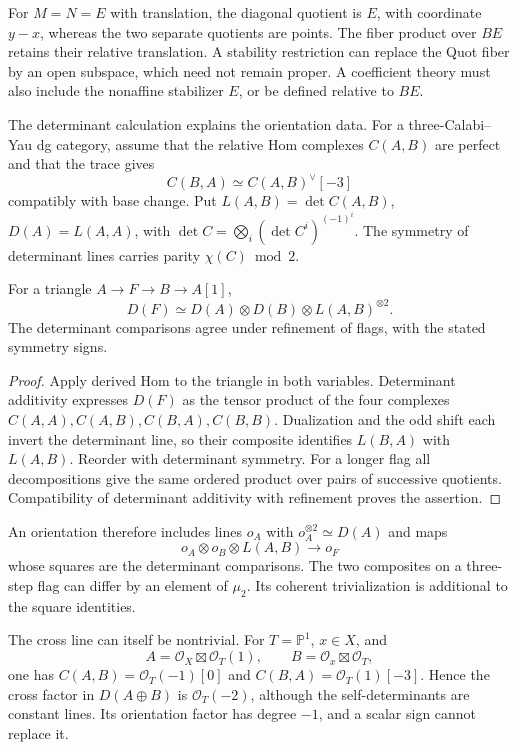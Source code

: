 For \(M=N=E\) with translation, the diagonal quotient is
\(E\), with coordinate \(y-x\), whereas the two separate
quotients are points. The fiber product over \(BE\)
retains their relative translation.
A stability restriction can replace the Quot fiber by an
open subspace, which need not remain proper.
A coefficient theory must also include the nonaffine
stabilizer \(E\), or be defined relative to \(BE\).

The determinant calculation explains the orientation data.
For a three-Calabi--Yau dg category, assume that the relative
Hom complexes \(C(A,B)\) are perfect and that the trace gives
\[
 C(B,A)\simeq C(A,B)^\vee[-3]
\]
compatibly with base change.
Put \(L(A,B)=\det C(A,B)\), \(D(A)=L(A,A)\), with
\(\det C=\bigotimes_i(\det C^i)^{(-1)^i}\).
The symmetry of determinant lines carries parity
\(\chi(C)\bmod2\).

\begin{proposition}\label{mht:prop:compact-extension-line}
For a triangle \(A\to F\to B\to A[1]\),
\[
 D(F)\simeq D(A)\otimes D(B)\otimes L(A,B)^{\otimes2}.
\]
The determinant comparisons agree under refinement of flags,
with the stated symmetry signs.
\end{proposition}
\begin{proof}
Apply derived Hom to the triangle in both variables.
Determinant additivity expresses \(D(F)\) as the tensor
product of the four complexes \(C(A,A),C(A,B),C(B,A),C(B,B)\).
Dualization and the odd shift each invert the determinant
line, so their composite identifies \(L(B,A)\) with
\(L(A,B)\). Reorder with determinant symmetry.
For a longer flag all decompositions give the same ordered
product over pairs of successive quotients.
Compatibility of determinant additivity with refinement
proves the assertion.
\end{proof}

An orientation therefore includes lines \(o_A\) with
\(o_A^{\otimes2}\simeq D(A)\) and maps
\[
 o_A\otimes o_B\otimes L(A,B)\longrightarrow o_F
\]
whose squares are the determinant comparisons.
The two composites on a three-step flag can differ by
an element of \(\mu_2\). Its coherent trivialization is
additional to the square identities.

The cross line can itself be nontrivial.
For \(T=\mathbb P^1\), \(x\in X\), and
\[
 A=\mathcal O_X\boxtimes\mathcal O_T(1),\qquad
 B=\mathcal O_x\boxtimes\mathcal O_T,
\]
one has \(C(A,B)=\mathcal O_T(-1)[0]\) and
\(C(B,A)=\mathcal O_T(1)[-3]\).
Hence the cross factor in \(D(A\oplus B)\) is
\(\mathcal O_T(-2)\), although the self-determinants
are constant lines. Its orientation factor has degree
\(-1\), and a scalar sign cannot replace it.

